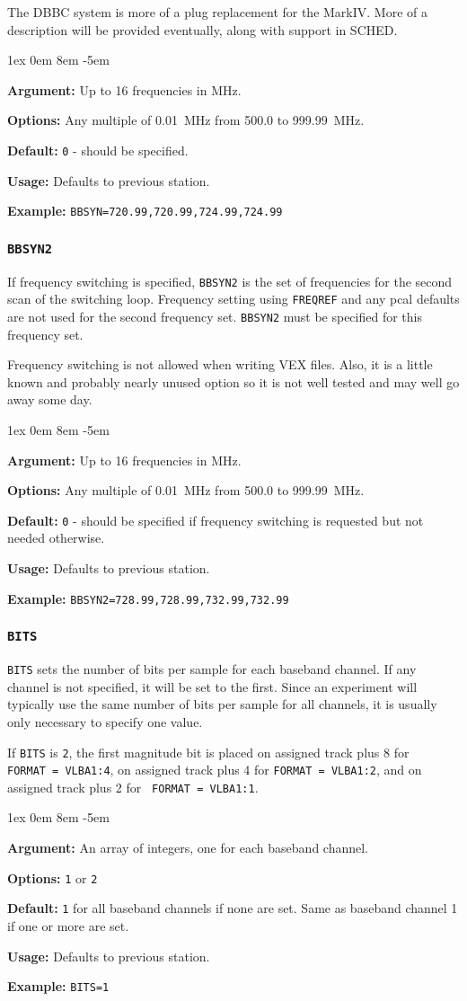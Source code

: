 \documentclass{report}
\newcommand{\sched}{{\sc SCHED}}
\newcommand{\rcwbox}[5]{
  \begin{list}{}{\parsep 1ex  \itemsep 0em
                 \leftmargin 8em  \itemindent -5em }
    \item {\bf Argument:} #1
    \item {\bf Options:}  #2
    \item {\bf Default:}  #3
    \item {\bf Usage:}    #4
    \item {\bf Example:}  #5
  \end{list}
}
\begin{document}
The DBBC system is more of a plug replacement for the MarkIV.
More of a description will be provided eventually, along with support
in \sched.

\rcwbox
{Up to 16 frequencies in MHz.}
{Any multiple of 0.01~MHz from 500.0 to 999.99~MHz.}
{{\tt 0} - should be specified.}
{Defaults to previous station.}
{{\tt BBSYN=720.99,720.99,724.99,724.99}}


\subsubsection{\label{SP:BBSYN2}{\tt BBSYN2}}

If frequency switching is specified, {\tt BBSYN2} is the
set of frequencies for the second scan of the switching loop.
Frequency setting using {\tt FREQREF} and any pcal defaults are not
used for the second frequency set. {\tt BBSYN2} must be specified for
this frequency set.

Frequency switching is not allowed when writing VEX files.  Also, it
is a little known and probably nearly unused option so it is not
well tested and may well go away some day.

\rcwbox
{Up to 16 frequencies in MHz.}
{Any multiple of 0.01~MHz from 500.0 to 999.99~MHz.}
{{\tt 0} - should be specified if frequency switching is requested
but not needed otherwise.}
{Defaults to previous station.}
{{\tt BBSYN2=728.99,728.99,732.99,732.99}}


\subsubsection{\label{SP:BITS}{\tt BITS}}

{\tt BITS} sets the number of bits per sample for each baseband channel.
If any channel is not specified, it will be set to the first.  Since
an experiment will typically use the same number of bits per sample
for all channels, it is usually only necessary to specify one value.

If {\tt BITS} is {\tt 2}, the first magnitude bit is placed on assigned
track plus 8 for {\tt FORMAT~= VLBA1:4}, on assigned track plus 4 for
{\tt FORMAT~= VLBA1:2}, and on assigned track plus 2 for {\tt
FORMAT~= VLBA1:1}.

\rcwbox
{An array of integers, one for each baseband channel.}
{{\tt 1} or {\tt 2}}
{{\tt 1} for all baseband channels if none are set. Same as baseband
channel 1 if one or more are set.}
{Defaults to previous station.}
{{\tt BITS=1}}
\end{document}
